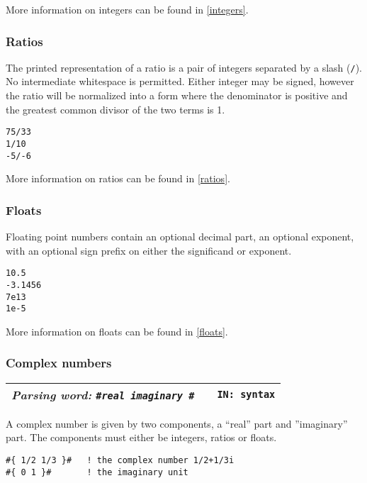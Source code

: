\documentclass{report}
\newcommand{\tto}{\symbol{123}}
\newcommand{\ttc}{\symbol{125}}
\newcommand{\parsingword}[3]{\index{#1}
\emph{Parsing word:} \texttt{#2} &&\texttt{IN: #3}}
\newcommand{\wordtable}[1]{

\begin{tabularx}{12cm}[t]{lXr}
\hline
#1\\
\hline
\end{tabularx}

}
\begin{document}
More information on integers can be found in \ref{integers}.

\subsubsection{Ratios}

\newcommand{\ratioglos}{}
\ratioglos

The printed representation of a ratio is a pair of integers separated by a slash (\texttt{/}).
No intermediate whitespace is permitted. Either integer may be signed, however the ratio will be normalized into a form where the denominator is positive and the greatest common divisor
of the two terms is 1.
\begin{alltt}
75/33
1/10
-5/-6
\end{alltt}

More information on ratios can be found in \ref{ratios}.

\subsubsection{Floats}

\newcommand{\floatglos}{}
\floatglos

Floating point numbers contain an optional decimal part, an optional exponent, with
an optional sign prefix on either the significand or exponent.
\begin{alltt}
10.5
-3.1456
7e13
1e-5
\end{alltt}

More information on floats can be found in \ref{floats}.

\subsubsection{\label{complex-literals}Complex numbers}

\newcommand{\complexglos}{}
\complexglos
\wordtable{
\parsingword{hash-curly}{\#\tto \emph{real} \emph{imaginary} \ttc\#}{syntax}
}
A complex number
is given by two components, a ``real'' part and ''imaginary'' part. The components
must either be integers, ratios or floats.
\begin{verbatim}
#{ 1/2 1/3 }#   ! the complex number 1/2+1/3i
#{ 0 1 }#       ! the imaginary unit
\end{verbatim}
\end{document}
